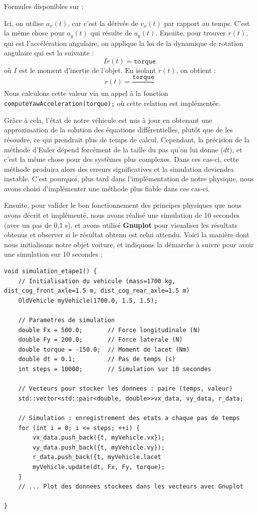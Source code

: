 \begin{center}
    Formules disponibles sur : \cite{euler_explicite}
\end{center}

Ici, on utilise $a_x(t)$, car c'est la dérivée de $v_x(t)$ par rapport au temps. C'est la même chose pour $a_y(t)$ qui résulte de $a_y(t)$. Ensuite, pour trouver $\dot{r}(t)$, qui est l'accélération angulaire, on applique la loi de la dynamique de rotation angulaire qui est la suivante :
$$I\dot{r}(t) = \texttt{torque}$$
où $I$ est le moment d'inertie de l'objet. En isolant $\dot{r}(t)$, on obtient :
$$\dot{r}(t)= {\frac{\texttt{torque}}{}}$$
Nous calculons cette valeur via un appel à la fonction \texttt{computeYawAcceleration(torque);} où cette relation est implémentée.

Grâce à cela, l'état de notre véhicule est mis à jour en obtenant une approximation de la solution des équations différentielles, plutôt que de les résoudre, ce qui prendrait plus de temps de calcul.
Cependant, la précision de la méthode d'Euler dépend forcément de la taille du pas qu'on lui donne ($dt$), et c'est la même chose pour des systèmes plus complexes. Dans ces cas-ci, cette méthode produira alors des erreurs significatives et la simulation deviendra instable. C'est pourquoi, plus tard dans l'implémentation de notre physique, nous avons choisi d'implémenter une méthode plus fiable dans ces cas-ci.

Ensuite, pour valider le bon fonctionnement des principes physiques que nous avons décrit et implémenté, nous avons réalisé une simulation de 10 secondes (avec un pas de 0,1 s), et avons utilisé \textbf{Gnuplot} pour visualiser les résultats obtenus et observer si le résultat obtenu est celui attendu. Voici la manière dont nous initialisons notre objet voiture, et indiquons la démarche à suivre pour avoir une simulation sur 10 secondes :
\begin{lstlisting}[style=CStyle,label={lst:void_simulation_etape1}]
void simulation_etape1() {
    // Initialisation du vehicule (mass=1700 kg, dist_cog_front_axle=1.5 m, dist_cog_rear_axle=1.5 m)
    OldVehicle myVehicle(1700.0, 1.5, 1.5);

    // Parametres de simulation
    double Fx = 500.0;       // Force longitudinale (N)
    double Fy = 200.0;       // Force laterale (N)
    double torque = -150.0;  // Moment de lacet (Nm)
    double dt = 0.1;         // Pas de temps (s)
    int steps = 10000;       // Simulation sur 10 secondes

    // Vecteurs pour stocker les donnees : paire (temps, valeur)
    std::vector<std::pair<double, double>>vx_data, vy_data, r_data;

    // Simulation : enregistrement des etats a chaque pas de temps
    for (int i = 0; i <= steps; ++i) {
        vx_data.push_back({t, myVehicle.vx});
        vy_data.push_back({t, myVehicle.vy});
        r_data.push_back({t, myVehicle.lacet
        myVehicle.update(dt, Fx, Fy, torque);
    }
    // ... Plot des donnees stockees dans les vecteurs avec Gnuplot

}
\end{lstlisting}

